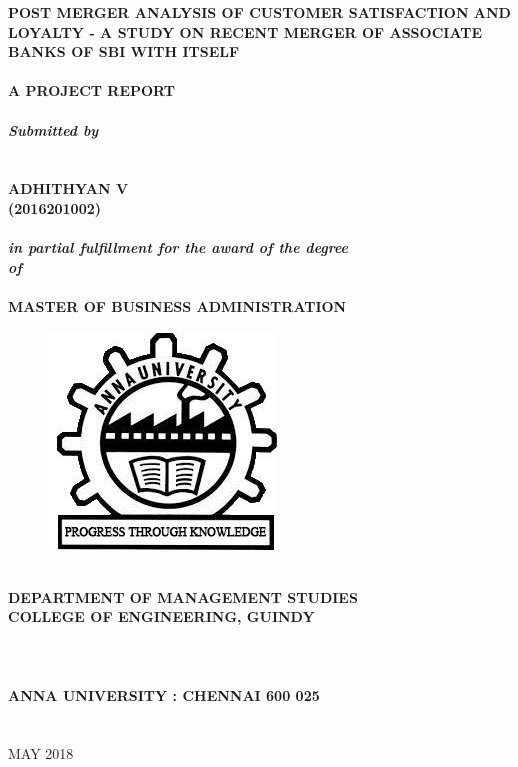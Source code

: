 \documentclass[a4paper, 12pt]{extarticle}
\newcommand\tab[1][1cm]{\hspace*{#1}}
\begin{document}
{
\selectfont
\begin{center}	
\textbf{\fontsize{18}{2} \selectfont POST MERGER ANALYSIS OF CUSTOMER SATISFACTION AND LOYALTY - A STUDY ON RECENT MERGER OF ASSOCIATE BANKS OF SBI WITH ITSELF}\\
\tab \\
\textbf{\fontsize{14}{2} \selectfont A PROJECT REPORT}\\
\tab \\
\textbf{\fontsize{14}{2} \selectfont \emph{Submitted by}}\\
\tab \\
\tab \\
{\fontsize{16}{2} \selectfont
\textbf{ADHITHYAN V}}\\
{\fontsize{16}{2} \selectfont \textbf{(2016201002)}}\\
\tab \\
\textbf{\emph{\fontsize{14}{2} \selectfont in partial fulfillment for the award of the degree\\ of}}\\
\tab \\
\textbf{\fontsize{16}{2} \selectfont MASTER OF BUSINESS ADMINISTRATION}\\
\begin{figure}[H]
\centering
\includegraphics[scale=0.5]{anna_univ_logo.jpg}
\end{figure}
\tab \\
\textbf{\fontsize{14}{2} \selectfont DEPARTMENT OF MANAGEMENT STUDIES}\\
\textbf{\fontsize{14}{2} \selectfont COLLEGE OF ENGINEERING, GUINDY}\\
\tab \\
\tab \\
\tab \\
\textbf{\fontsize{16}{2} \selectfont ANNA UNIVERSITY : CHENNAI 600 025}\\
\tab \\
\tab \\
{\fontsize{14}{2} \selectfont MAY 2018}\\
\end{center}
	
}
\end{document}
